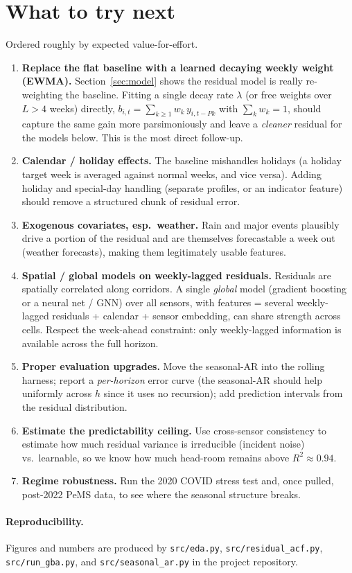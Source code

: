 \documentclass[11pt]{article}
\begin{document}
\section{What to try next}
\label{sec:next}
Ordered roughly by expected value-for-effort.

\begin{enumerate}
\item \textbf{Replace the flat baseline with a learned decaying weekly weight
  (EWMA).} Section~\ref{sec:model} shows the residual model is really
  re-weighting the baseline. Fitting a single decay rate $\lambda$ (or free
  weights over $L>4$ weeks) directly,
  $b_{i,t}=\sum_{k\ge1} w_k\,y_{i,t-Pk}$ with $\sum_k w_k=1$, should capture the
  same gain more parsimoniously and leave a \emph{cleaner} residual for the
  models below. This is the most direct follow-up.
\item \textbf{Calendar / holiday effects.} The baseline mishandles holidays (a
  holiday target week is averaged against normal weeks, and vice versa). Adding
  holiday and special-day handling (separate profiles, or an indicator feature)
  should remove a structured chunk of residual error.
\item \textbf{Exogenous covariates, esp.\ weather.} Rain and major events plausibly
  drive a portion of the residual and are themselves forecastable a week out
  (weather forecasts), making them legitimately usable features.
\item \textbf{Spatial / global models on weekly-lagged residuals.} Residuals are
  spatially correlated along corridors. A single \emph{global} model (gradient
  boosting or a neural net / GNN) over all sensors, with features = several
  weekly-lagged residuals + calendar + sensor embedding, can share strength
  across cells. Respect the week-ahead constraint: only weekly-lagged
  information is available across the full horizon.
\item \textbf{Proper evaluation upgrades.} Move the seasonal-AR into the rolling
  harness; report a \emph{per-horizon} error curve (the seasonal-AR should help
  uniformly across $h$ since it uses no recursion); add prediction intervals from
  the residual distribution.
\item \textbf{Estimate the predictability ceiling.} Use cross-sensor consistency
  to estimate how much residual variance is irreducible (incident noise) vs.\
  learnable, so we know how much head-room remains above $R^2\approx0.94$.
\item \textbf{Regime robustness.} Run the 2020 COVID stress test and, once
  pulled, post-2022 PeMS data, to see where the seasonal structure breaks.
\end{enumerate}

\paragraph{Reproducibility.} Figures and numbers are produced by
\texttt{src/eda.py}, \texttt{src/residual\_acf.py}, \texttt{src/run\_gba.py},
and \texttt{src/seasonal\_ar.py} in the project repository.
\end{document}
